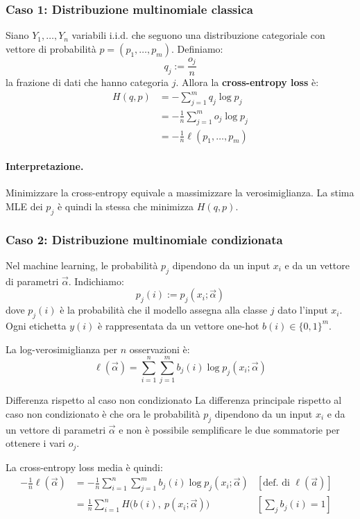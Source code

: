 \subsubsection*{Caso 1: Distribuzione multinomiale classica}
Siano \( Y_1, \dots, Y_n \) variabili i.i.d. che seguono una
distribuzione categoriale con vettore di probabilità \( p = (p_1, \dots, p_m) \).
Definiamo:
\[
    q_j := \frac{o_j}{n}
\]
la frazione di dati che hanno categoria \(j\).
Allora la \textbf{cross-entropy loss} è:
\begin{align*}
    H(q, p)
            &= - \sum_{j=1}^m q_j \log p_j \\
            &= - \frac{1}{n} \sum_{j=1}^m o_j \log p_j \\
            &= - \frac{1}{n} \ell(p_1, \dots, p_m)
\end{align*}

\paragraph{Interpretazione.} Minimizzare la cross-entropy equivale a massimizzare la verosimiglianza. La stima MLE dei \( p_j \) è quindi la stessa che minimizza \( H(q, p) \).

\subsubsection*{Caso 2: Distribuzione multinomiale
condizionata}\label{likelihood:mult_cond}

Nel machine learning, le probabilità \( p_j \) dipendono da un input \( x_i \) e da un vettore di parametri \( \vec{\alpha} \). Indichiamo:
\[
p_j(i) := p_j(x_i; \vec{\alpha})
\]
dove \( p_j(i) \) è la probabilità che il modello assegna alla classe \( j \) dato l'input \( x_i \). Ogni etichetta \( y(i) \) è rappresentata da un vettore one-hot \( b(i) \in \{0, 1\}^m \).

La log-verosimiglianza per \( n \) osservazioni è:
\[
\ell(\vec{\alpha}) = \sum_{i=1}^n \sum_{j=1}^m b_j(i) \log p_j(x_i; \vec{\alpha})
\]
\begin{nota}{Differenza rispetto al caso non condizionato}{}
    La differenza principale rispetto al caso non condizionato è che ora le
    probabilità \( p_j \) dipendono da un input \( x_i \) e da un vettore di
    parametri \( \vec{\alpha} \) e non è possibile semplificare le due
    sommatorie per ottenere i vari \( o_j \).
\end{nota}
La cross-entropy loss media è quindi:
\begin{align*}
- \frac{1}{n} \ell(\vec{\alpha})
    &= - \frac{1}{n} \sum_{i=1}^n \sum_{j=1}^m b_j(i) \log p_j(x_i; \vec{\alpha}) & [\text{def. di } \ell(\vec{a})] &\\
    &= \frac{1}{n} \sum_{i=1}^n H\big(b(i),\ p(x_i; \vec{\alpha})\big) & \left[\sum_j{b_j(i)} = 1\right]
\end{align*}

